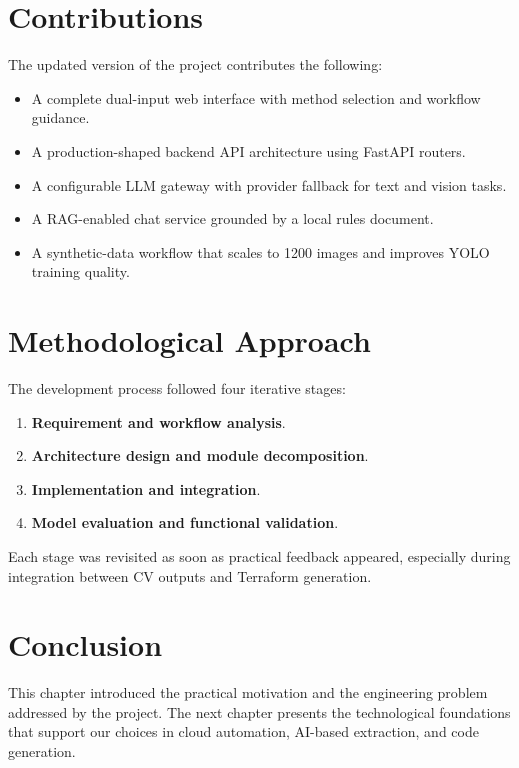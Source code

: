 \documentclass[12pt,a4paper,openany]{report}
\begin{document}
\section{Contributions}

The updated version of the project contributes the following:
\begin{itemize}
    \item A complete dual-input web interface with method selection and workflow guidance.
    \item A production-shaped backend API architecture using FastAPI routers.
    \item A configurable LLM gateway with provider fallback for text and vision tasks.
    \item A RAG-enabled chat service grounded by a local rules document.
    \item A synthetic-data workflow that scales to 1200 images and improves YOLO training quality.
\end{itemize}

\section{Methodological Approach}

The development process followed four iterative stages:
\begin{enumerate}
    \item \textbf{Requirement and workflow analysis}.
    \item \textbf{Architecture design and module decomposition}.
    \item \textbf{Implementation and integration}.
    \item \textbf{Model evaluation and functional validation}.
\end{enumerate}

Each stage was revisited as soon as practical feedback appeared, especially during integration between CV outputs and Terraform generation.

\section{Conclusion}

This chapter introduced the practical motivation and the engineering problem addressed by the project. The next chapter presents the technological foundations that support our choices in cloud automation, AI-based extraction, and code generation.

\end{document}

